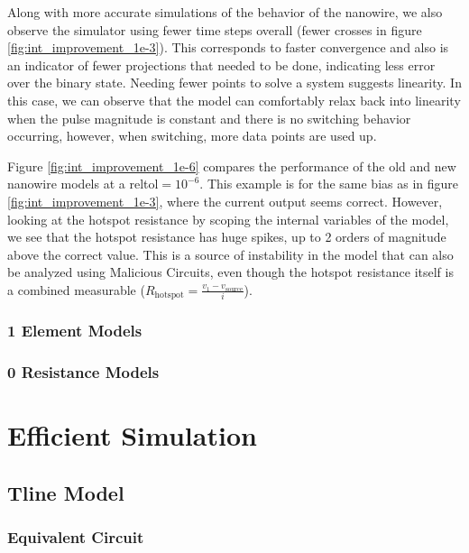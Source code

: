 \documentclass[]{article}
\newcommand{\todo}[2][]{}
\newcommand{\cf}[1]{\textsf{#1}}
\begin{document}
Along with more accurate simulations of the behavior of the nanowire, we also
observe the simulator using fewer time steps overall (fewer crosses in figure 
\ref{fig:int_improvement_1e-3}). This corresponds to faster convergence and also is
an indicator of fewer projections that needed to be done, indicating less
error over the binary state. Needing fewer points to solve a system suggests
linearity. In this case, we can observe that the model can comfortably relax
back into linearity when the pulse magnitude is constant and there is no
switching behavior occurring, however, when switching, more data points are used up.

Figure \ref{fig:int_improvement_1e-6} compares the performance of the old and new 
nanowire models at a \cf{reltol$=10^{-6}$}. This example is for the same bias as in 
figure \ref{fig:int_improvement_1e-3}, where the current output seems correct.
However, looking at the hotspot resistance by scoping the internal variables of the 
model, we see that the hotspot resistance has huge spikes, up to 2 orders of magnitude
above the correct value. This is a source of instability in the model that can also
be analyzed using Malicious Circuits, even though the hotspot resistance itself is
a combined measurable ($R_{\mathrm{hotspot}} = \frac{v_1 - v_{\mathrm{source}}}{i}$).

\subsubsection{1 Element Models}

\subsubsection{0 Resistance Models}

\section{Efficient Simulation} \label{julia-sim-chapter}

\todo[inline]{Julia simulator}

\subsection{Tline Model}

\subsubsection{Equivalent Circuit}
\end{document}
